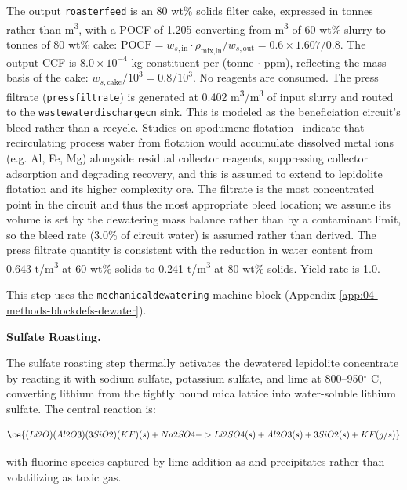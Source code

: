 \documentclass{article}
\renewcommand\_{\textunderscore\allowbreak}
\newcommand{\alteq}[1]{}
\newcommand{\alteqend}{}
\begin{document}
The output \texttt{roaster\_feed} is an 80 wt\% solids filter cake, expressed in tonnes rather than \si{m^3}, with a POCF of 1.205 converting from \si{m^3} of 60 wt\% slurry to tonnes of 80 wt\% cake: $\text{POCF} = w_{s,\text{in}} \cdot \rho_{\text{mix,in}} / w_{s,\text{out}} = 0.6 \times 1.607 / 0.8$. The output CCF is $8.0 \times 10^{-4}$ kg constituent per (tonne $\cdot$ ppm), reflecting the mass basis of the cake: $w_{s,\text{cake}} / 10^3 = 0.8 / 10^3$. No reagents are consumed. The press filtrate (\texttt{press\_filtrate}) is generated at 0.402 \si{m^3/m^3} of input slurry and routed to the \texttt{wastewater\_discharge\_cn} sink. This is modeled as the beneficiation circuit's bleed rather than a recycle. Studies on spodumene flotation~\cite{sauberEffectRecycledProcess2025} indicate that recirculating process water from flotation would accumulate dissolved metal ions (e.g. Al, Fe, Mg) alongside residual collector reagents, suppressing collector adsorption and degrading recovery, and this is assumed to extend to lepidolite flotation and its higher complexity ore. The filtrate is the most concentrated point in the circuit and thus the most appropriate bleed location; we assume its volume is set by the dewatering mass balance rather than by a contaminant limit, so the bleed rate (3.0\% of circuit water) is assumed rather than derived. The press filtrate quantity is consistent with the reduction in water content from 0.643 \si{t/m^3} at 60 wt\% solids to 0.241 \si{t/m^3} at 80 wt\% solids. Yield rate is 1.0.

This step uses the \texttt{mechanical\_dewatering} machine block (Appendix \ref{app:04-methods-blockdefs-dewater}).

\medskip
\noindent\textbf{Sulfate Roasting.}\quad

The sulfate roasting step thermally activates the dewatered lepidolite concentrate by reacting it with sodium sulfate, potassium sulfate, and lime at 800--950$^\circ$
C, converting lithium from the tightly bound mica lattice into water-soluble lithium sulfate. The central reaction is:
\alteq{Solid lepidolite consisting of lithium oxide, aluminum oxide, three silicon dioxide units, and potassium fluoride reacts with sodium sulfate to produce solid lithium sulfate, solid aluminum oxide, solid silicon dioxide, and potassium fluoride as a gas or solid.}
\begin{equation}
	\ce{(Li2O)(Al2O3)(3SiO2)(KF)(s) + Na2SO4 -> Li2SO4 (s) + Al2O3 (s) + 3SiO2 (s) + KF (g/s)}
\end{equation}
\alteqend
with fluorine species captured by lime addition as  and  precipitates rather than volatilizing as toxic  gas.
\end{document}
